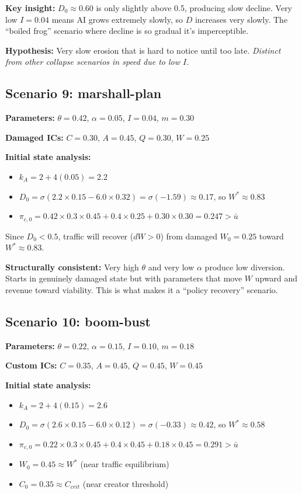 \documentclass[11pt]{article}
\newcommand{\cmark}{\ding{51}}
\begin{document}
\textbf{Key insight:} $D_0 \approx 0.60$ is only slightly above 0.5, producing slow decline. Very low $I=0.04$ means AI grows extremely slowly, so $D$ increases very slowly. The ``boiled frog'' scenario where decline is so gradual it's imperceptible.

\textcolor{myorange}{\textbf{Hypothesis:}} Very slow erosion that is hard to notice until too late. \textit{Distinct from other collapse scenarios in speed due to low $I$.}

\subsection{Scenario 9: marshall-plan}
\textbf{Parameters:} $\theta=0.42$, $\alpha=0.05$, $I=0.04$, $m=0.30$

\textbf{Damaged ICs:} $C=0.30$, $A=0.45$, $Q=0.30$, $W=0.25$

\textbf{Initial state analysis:}
\begin{itemize}
    \item $k_A = 2 + 4(0.05) = 2.2$
    \item $D_0 = \sigma(2.2 \times 0.15 - 6.0 \times 0.32) = \sigma(-1.59) \approx 0.17$, so $W^* \approx 0.83$
    \item $\pi_{c,0} = 0.42 \times 0.3 \times 0.45 + 0.4 \times 0.25 + 0.30 \times 0.30 = 0.247 > \bar{u}$
\end{itemize}

Since $D_0 < 0.5$, traffic will recover ($dW > 0$) from damaged $W_0=0.25$ toward $W^* \approx 0.83$.

\textcolor{mygreen}{\cmark} \textbf{Structurally consistent:} Very high $\theta$ and very low $\alpha$ produce low diversion. Starts in genuinely damaged state but with parameters that move $W$ upward and revenue toward viability. This is what makes it a ``policy recovery'' scenario.

\subsection{Scenario 10: boom-bust}
\textbf{Parameters:} $\theta=0.22$, $\alpha=0.15$, $I=0.10$, $m=0.18$

\textbf{Custom ICs:} $C=0.35$, $A=0.45$, $Q=0.45$, $W=0.45$

\textbf{Initial state analysis:}
\begin{itemize}
    \item $k_A = 2 + 4(0.15) = 2.6$
    \item $D_0 = \sigma(2.6 \times 0.15 - 6.0 \times 0.12) = \sigma(-0.33) \approx 0.42$, so $W^* \approx 0.58$
    \item $\pi_{c,0} = 0.22 \times 0.3 \times 0.45 + 0.4 \times 0.45 + 0.18 \times 0.45 = 0.291 > \bar{u}$
    \item $W_0 = 0.45 \approx W^*$ (near traffic equilibrium)
    \item $C_0 = 0.35 \approx C_{crit}$ (near creator threshold)
\end{itemize}
\end{document}
